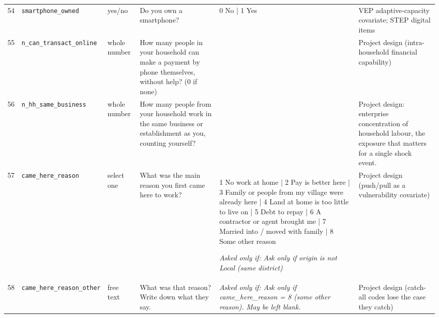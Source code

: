 \documentclass[9pt,a4paper,landscape]{article}
\begin{document}
\begin{longtable}{@{}p{0.5cm}p{3.3cm}p{1.7cm}p{7.3cm}p{5.6cm}p{5.4cm}@{}}
\footnotesize 54 & \footnotesize\texttt{smartphone\_owned} & \scriptsize yes/no & \footnotesize Do you own a smartphone?\par\vspace{1pt}{\footnotesize\color{hdr}{\hifont क्या आपके पास स्मार्टफ़ोन है?}} & \scriptsize 0 No | 1 Yes & \scriptsize VEP adaptive-capacity covariate; STEP digital items\\
\footnotesize 55 & \footnotesize\texttt{n\_can\_transact\_online} & \scriptsize whole number & \footnotesize How many people in your household can make a payment by phone themselves, without help? (0 if none)\par\vspace{1pt}{\footnotesize\color{hdr}{\hifont आपके घर में कितने लोग बिना किसी की मदद के फ़ोन से पैसे भेज सकते हैं? (कोई नहीं तो 0)}} & \scriptsize  & \scriptsize Project design (intra-household financial capability)\\
\footnotesize 56 & \footnotesize\texttt{n\_hh\_same\_business} & \scriptsize whole number & \footnotesize How many people from your household work in the same business or establishment as you, counting yourself?\par\vspace{1pt}{\footnotesize\color{hdr}{\hifont आपके घर के कितने लोग आपके साथ उसी काम या उसी दुकान/धंधे में काम करते हैं, आपको भी गिनकर?}} & \scriptsize  & \scriptsize Project design: enterprise concentration of household labour, the exposure that matters for a single shock event.\\
\footnotesize 57 & \footnotesize\texttt{came\_here\_reason} & \scriptsize select one & \footnotesize What was the main reason you first came here to work?\par\vspace{1pt}{\footnotesize\color{hdr}{\hifont आप सबसे पहले यहाँ काम करने किस मुख्य वजह से आए थे?}} & \scriptsize 1 No work at home | 2 Pay is better here | 3 Family or people from my village were already here | 4 Land at home is too little to live on | 5 Debt to repay | 6 A contractor or agent brought me | 7 Married into / moved with family | 8 Some other reason\par\vspace{1pt}\textit{Asked only if: Ask only if origin is not Local (same district)} & \scriptsize Project design (push/pull as a vulnerability covariate)\\
\footnotesize 58 & \footnotesize\texttt{came\_here\_reason\_other} & \scriptsize free text & \footnotesize What was that reason? Write down what they say.\par\vspace{1pt}{\footnotesize\color{hdr}{\hifont वह वजह क्या थी? जो वे कहें वही लिख लें।}} & \scriptsize \textit{Asked only if: Ask only if came\_here\_reason = 8 (some other reason). May be left blank.} & \scriptsize Project design (catch-all codes lose the case they catch)\\

\end{longtable}
\end{document}
